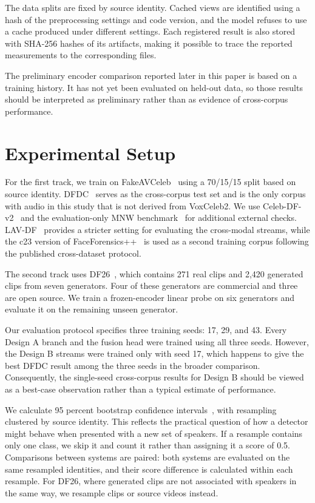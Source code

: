 \documentclass[conference]{IEEEtran}
\begin{document}
The data splits are fixed by source identity. Cached views are identified
using a hash of the preprocessing settings and code version, and the model
refuses to use a cache produced under different settings. Each registered
result is also stored with SHA-256 hashes of its artifacts, making it possible
to trace the reported measurements to the corresponding files.

The preliminary encoder comparison reported later in this paper is based on
a training history. It has not yet been evaluated on held-out data, so those
results should be interpreted as preliminary rather than as evidence of
cross-corpus performance.

\section{Experimental Setup}

For the first track, we train on FakeAVCeleb~\cite{fakeavceleb} using a
70/15/15 split based on source identity. DFDC~\cite{dfdc} serves as the
cross-corpus test set and is the only corpus with audio in this study that is
not derived from VoxCeleb2. We use Celeb-DF-v2~\cite{celebdf} and the
evaluation-only MNW benchmark~\cite{mnw} for additional external checks.
LAV-DF~\cite{lavdf} provides a stricter setting for evaluating the cross-modal
streams, while the c23 version of FaceForensics++~\cite{ffpp} is used as a
second training corpus following the published cross-dataset protocol.

The second track uses DF26~\cite{df26}, which contains 271 real clips and
2,420 generated clips from seven generators. Four of these generators are
commercial and three are open source. We train a frozen-encoder linear probe
on six generators and evaluate it on the remaining unseen generator.

Our evaluation protocol specifies three training seeds: 17, 29, and 43.
Every Design A branch and the fusion head were trained using all three seeds.
However, the Design B streams were trained only with seed 17, which happens
to give the best DFDC result among the three seeds in the broader comparison.
Consequently, the single-seed cross-corpus results for Design B should be
viewed as a best-case observation rather than a typical estimate of
performance.

We calculate 95 percent bootstrap confidence intervals~\cite{bootstrap},
with resampling clustered by source identity. This reflects the practical
question of how a detector might behave when presented with a new set of
speakers. If a resample contains only one class, we skip it and count it
rather than assigning it a score of 0.5. Comparisons between systems are
paired: both systems are evaluated on the same resampled identities, and
their score difference is calculated within each resample. For DF26, where
generated clips are not associated with speakers in the same way, we resample
clips or source videos instead.
\end{document}
